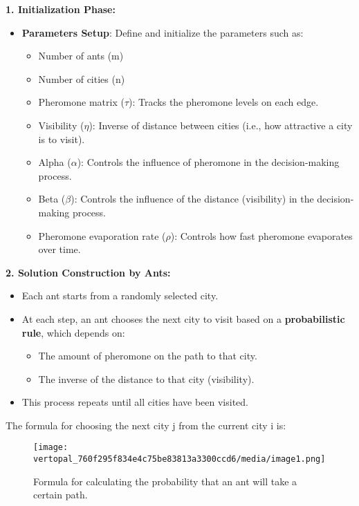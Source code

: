 \documentclass[
]{article}
\begin{document}
\textbf{1. Initialization Phase:}

\begin{itemize}
\item
  \textbf{Parameters Setup}: Define and initialize the parameters such
  as:

  \begin{itemize}
  \item
    Number of ants (m)
  \item
    Number of cities (n)
  \item
    Pheromone matrix ($\tau$): Tracks the pheromone levels on each edge.
  \item
    Visibility ($\eta$): Inverse of distance between cities (i.e., how
    attractive a city is to visit).
  \item
    Alpha ($\alpha$): Controls the influence of pheromone in the
    decision-making process.
  \item
    Beta ($\beta$): Controls the influence of the distance (visibility) in the
    decision-making process.
  \item
    Pheromone evaporation rate ($\rho$): Controls how fast pheromone
    evaporates over time.
  \end{itemize}
\end{itemize}

\textbf{2. Solution Construction by Ants:}

\begin{itemize}
\item
  Each ant starts from a randomly selected city.
\item
  At each step, an ant chooses the next city to visit based on a
  \textbf{probabilistic rule}, which depends on:

  \begin{itemize}
  \item
    The amount of pheromone on the path to that city.
  \item
    The inverse of the distance to that city (visibility).
  \end{itemize}
\item
  This process repeats until all cities have been visited.
\end{itemize}

The formula for choosing the next city j from the current city i is:

\begin{figure}[htbp]
\centering
\texttt{[image: vertopal\_760f295f834e4c75be83813a3300ccd6/media/image1.png]}
\caption{Formula for calculating the probability that an ant will take a certain path. \label{fig:my_label}}
\end{figure}
\end{document}
